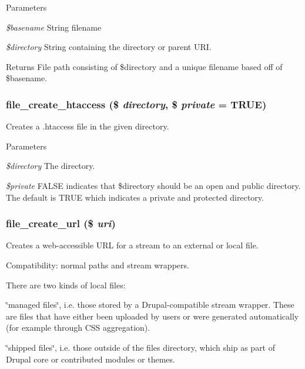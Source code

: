 \begin{DoxyParams}{Parameters}
\item[{\em \$basename}]String filename \item[{\em \$directory}]String containing the directory or parent URI.\end{DoxyParams}
\begin{DoxyReturn}{Returns}
File path consisting of \$directory and a unique filename based off of \$basename. 
\end{DoxyReturn}
\hypertarget{group__file_gaf30766eaa4c080c8d61a9aa0cf89739b}{
\subsubsection[{file\_\-create\_\-htaccess}]{\setlength{\rightskip}{0pt plus 5cm}file\_\-create\_\-htaccess (\$ {\em directory}, \/  \$ {\em private} = {\ttfamily TRUE})}}
\label{group__file_gaf30766eaa4c080c8d61a9aa0cf89739b}
Creates a .htaccess file in the given directory.


\begin{DoxyParams}{Parameters}
\item[{\em \$directory}]The directory. \item[{\em \$private}]FALSE indicates that \$directory should be an open and public directory. The default is TRUE which indicates a private and protected directory. \end{DoxyParams}
\hypertarget{group__file_gaee57f47d60bda90961a2e19d580d4908}{
\subsubsection[{file\_\-create\_\-url}]{\setlength{\rightskip}{0pt plus 5cm}file\_\-create\_\-url (\$ {\em uri})}}
\label{group__file_gaee57f47d60bda90961a2e19d580d4908}
Creates a web-\/accessible URL for a stream to an external or local file.

Compatibility: normal paths and stream wrappers.

There are two kinds of local files:
\begin{DoxyItemize}
\item \char`\"{}managed files\char`\"{}, i.e. those stored by a Drupal-\/compatible stream wrapper. These are files that have either been uploaded by users or were generated automatically (for example through CSS aggregation).
\item \char`\"{}shipped files\char`\"{}, i.e. those outside of the files directory, which ship as part of Drupal core or contributed modules or themes.
\end{DoxyItemize}



